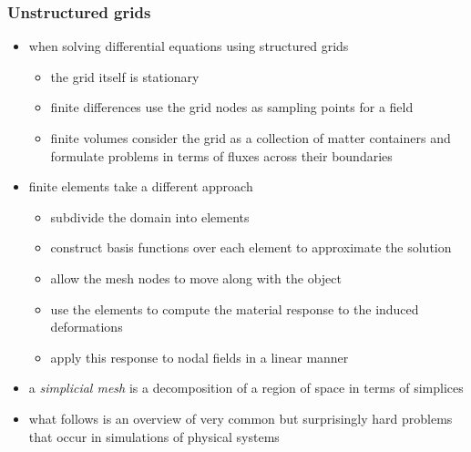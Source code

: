 %
%
%
%


\begin{frame}[fragile]
%
  \frametitle{Unstructured grids}
%
  \begin{itemize}
%
  \item when solving differential equations using structured grids
    \begin{itemize}
    \item the grid itself is stationary
    \item finite differences use the grid nodes as sampling points for a field
    \item finite volumes consider the grid as a collection of matter containers and formulate
      problems in terms of fluxes across their boundaries
    \end{itemize}
%
  \item finite elements take a different approach
    \begin{itemize}
    \item subdivide the domain into elements
    \item construct basis functions over each element to approximate the solution
    \item allow the mesh nodes to move along with the object
    \item use the elements to compute the material response to the induced deformations
    \item apply this response to nodal fields in a linear manner
    \end{itemize}
%
  \item a {\em simplicial mesh} is a decomposition of a region of space in terms of simplices
%
  \item what follows is an overview of very common but surprisingly hard problems that occur in
    simulations of physical systems
  \end{itemize}
%
\end{frame}

